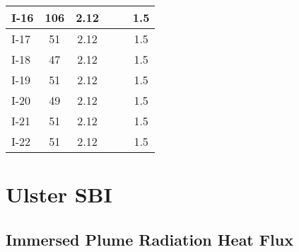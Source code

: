 \begin{table}[!ht]
\begin{center}
\begin{tabular}{|l|c|c||l|c|c|}
I-16       &  106              &  2.12      &            &                   &  1.5       \\ \hline
I-17       &  51               &  2.12      &            &                   &  1.5       \\ \hline
I-18       &  47               &  2.12      &            &                   &  1.5       \\ \hline
I-19       &  51               &  2.12      &            &                   &  1.5       \\ \hline
I-20       &  49               &  2.12      &            &                   &  1.5       \\ \hline
I-21       &  51               &  2.12      &            &                   &  1.5       \\ \hline
I-22       &  51               &  2.12      &            &                   &  1.5       \\ \hline
\end{tabular}
\end{center}
\end{table}


\clearpage


\section{Ulster SBI}

\subsection*{Immersed Plume Radiation Heat Flux}


